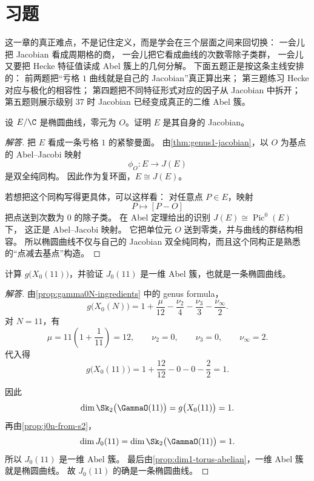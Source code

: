 \section{习题}
\label{sec:jacobian-exercises}

这一章的真正难点，不是记住定义，而是学会在三个层面之间来回切换：
一会儿把 Jacobian 看成周期格的商，
一会儿把它看成曲线的次数零除子类群，
一会儿又要把 Hecke 特征值读成 Abel 簇上的几何分解。
下面五题正是按这条主线安排的：
前两题把“亏格 $1$ 曲线就是自己的 Jacobian”真正算出来；
第三题练习 Hecke 对应与极化的相容性；
第四题把不同特征形式对应的因子从 Jacobian 中拆开；
第五题则展示级别 $37$ 时 Jacobian 已经变成真正的二维 Abel 簇。



\begin{exercise}
\label{ex:jacobian-ec-self}
设 $E/\C$ 是椭圆曲线，零元为 $O$。证明 $E$ 是其自身的 Jacobian。
\end{exercise}

\begin{proof}[解答]
把 $E$ 看成一条亏格 $1$ 的紧黎曼面。
由\cref{thm:genus1-jacobian}，以 $O$ 为基点的 Abel--Jacobi 映射
\[
  \phi_O:E\longrightarrow J(E)
\]
是双全纯同构。
因此作为复环面，$E\cong J(E)$。

若想把这个同构写得更具体，可以这样看：
对任意点 $P\in E$，映射
\[
  P\longmapsto [P-O]
\]
把点送到次数为 $0$ 的除子类。
在 Abel 定理给出的识别 $J(E)\cong \operatorname{Pic}^0(E)$ 下，
这正是 Abel--Jacobi 映射。
它把单位元 $O$ 送到零类，并与曲线的群结构相容。
所以椭圆曲线不仅与自己的 Jacobian 双全纯同构，而且这个同构正是熟悉的“点减去基点”构造。
\end{proof}

\begin{exercise}
\label{ex:jacobian-x011}
计算 $g\bigl(X_0(11)\bigr)$，并验证 $J_0(11)$ 是一维 Abel 簇，也就是一条椭圆曲线。
\end{exercise}

\begin{proof}[解答]
由\cref{prop:gamma0N-ingredients} 中的 genus formula，
\[
  g\bigl(X_0(N)\bigr)=1+\frac{\mu}{12}-\frac{\nu_2}{4}-\frac{\nu_3}{3}-\frac{\nu_\infty}{2}.
\]
对 $N=11$，有
\[
  \mu=11\left(1+\frac1{11}\right)=12,
  \qquad \nu_2=0,
  \qquad \nu_3=0,
  \qquad \nu_\infty=2.
\]
代入得
\[
  g\bigl(X_0(11)\bigr)=1+\frac{12}{12}-0-0-\frac22=1.
\]

因此
\[
  \dim \Sk_2\bigl(\GammaO(11)\bigr)=g\bigl(X_0(11)\bigr)=1.
\]
再由\cref{prop:j0n-from-s2}，
\[
  \dim J_0(11)=\dim \Sk_2\bigl(\GammaO(11)\bigr)=1.
\]
所以 $J_0(11)$ 是一维 Abel 簇。
最后由\cref{prop:dim1-torus-abelian}，一维 Abel 簇就是椭圆曲线。
故 $J_0(11)$ 的确是一条椭圆曲线。
\end{proof}

